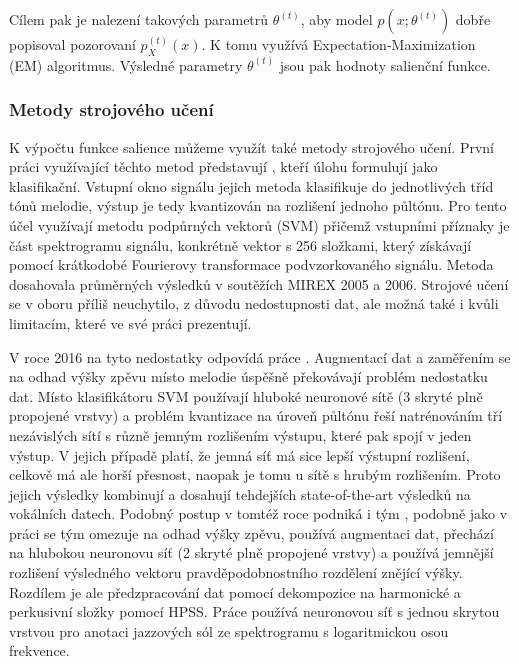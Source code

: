 Cílem pak je nalezení takových parametrů $\theta^{(t)}$, aby model $p(x; \theta^{(t)})$ dobře popisoval pozorovaní $p_X^{(t)}(x)$. K tomu \cite{Goto1999} využívá Expectation-Maximization (EM) algoritmus. Výsledné parametry $\theta^{(t)}$ jsou pak hodnoty salienční funkce.


\subsubsection{Metody strojového učení}

K výpočtu funkce salience můžeme využít také metody strojového učení. První práci využívající těchto metod představují \cite{Poliner}, kteří úlohu formulují jako klasifikační. Vstupní okno signálu jejich metoda klasifikuje do jednotlivých tříd tónů melodie, výstup je tedy kvantizován na rozlišení jednoho půltónu. Pro tento účel využívají metodu podpůrných vektorů (SVM) přičemž vstupními příznaky je část spektrogramu signálu, konkrétně vektor s 256 složkami, který získávají pomocí krátkodobé Fourierovy transformace podvzorkovaného signálu. Metoda dosahovala průměrných výsledků v soutěžích MIREX 2005 a 2006. Strojové učení se v oboru příliš neuchytilo, z důvodu nedostupnosti dat, ale možná také i kvůli limitacím, které \cite{Poliner} ve své práci prezentují.

V roce 2016 na tyto nedostatky odpovídá práce \cite{Kum2016}. Augmentací dat a zaměřením se na odhad výšky zpěvu místo melodie úspěšně překovávají problém nedostatku dat. Místo klasifikátoru SVM používají hluboké neuronové sítě (3 skryté plně propojené vrstvy) a problém kvantizace na úroveň půltónu řeší natrénováním tří nezávislých sítí s různě jemným rozlišením výstupu, které pak spojí v jeden výstup. V jejich případě platí, že jemná síť má sice lepší výstupní rozlišení, celkově má ale horší přesnost, naopak je tomu u sítě s hrubým rozlišením. Proto jejich výsledky kombinují a dosahují tehdejších state-of-the-art výsledků na vokálních datech. Podobný postup v tomtéž roce podniká i tým \cite{Rigaud2016}, podobně jako v práci \cite{Kum2016} se tým omezuje na odhad výšky zpěvu, používá augmentaci dat, přechází na hlubokou neuronovu síť (2 skryté plně propojené vrstvy) a používá jemnější rozlišení výsledného vektoru pravděpodobnostního rozdělení znějící výšky. Rozdílem je ale předzpracování dat pomocí dekompozice na harmonické a perkusivní složky pomocí HPSS. Práce \cite{Balke2017} používá neuronovou síť s jednou skrytou vrstvou pro anotaci jazzových sól ze spektrogramu s logaritmickou osou frekvence. 

